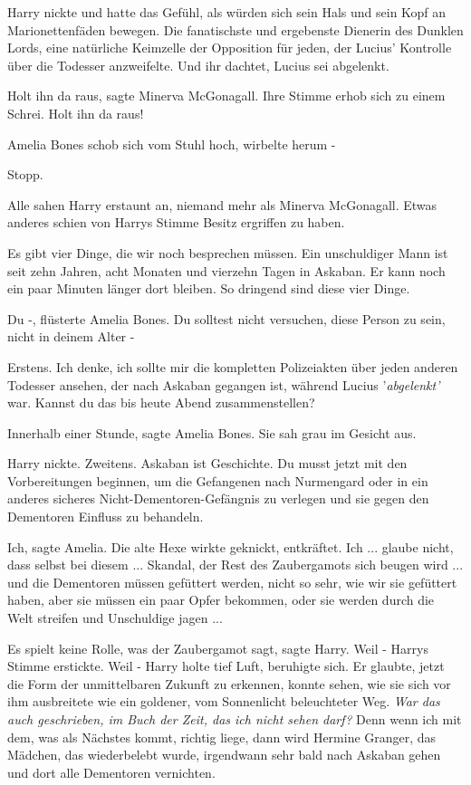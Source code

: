 Harry nickte und hatte das Gefühl, als würden sich sein Hals und sein Kopf an
Marionettenfäden bewegen. \glqq{}Die fanatischste und ergebenste Dienerin des
Dunklen Lords, eine natürliche Keimzelle der Opposition für jeden, der Lucius'
Kontrolle über die Todesser anzweifelte. Und ihr dachtet, Lucius sei abgelenkt.\grqq{}

\glqq{}Holt ihn da raus\grqq{}, sagte Minerva McGonagall. Ihre Stimme erhob sich
zu einem Schrei. \glqq{}Holt ihn da raus!\grqq{}

Amelia Bones schob sich vom Stuhl hoch, wirbelte herum -

\glqq{}Stopp.\grqq{}

Alle sahen Harry erstaunt an, niemand mehr als Minerva McGonagall. Etwas anderes
schien von Harrys Stimme Besitz ergriffen zu haben.

\glqq{}Es gibt vier Dinge, die wir noch besprechen müssen. Ein unschuldiger Mann
ist seit zehn Jahren, acht Monaten und vierzehn Tagen in Askaban. Er kann noch
ein paar Minuten länger dort bleiben. So dringend sind diese vier Dinge.\grqq{}

\glqq{}Du -\grqq{}, flüsterte Amelia Bones. \glqq{}Du solltest nicht versuchen,
diese Person zu sein, nicht in deinem Alter -\grqq{}

\glqq{}Erstens. Ich denke, ich sollte mir die kompletten Polizeiakten über jeden
anderen Todesser ansehen, der nach Askaban gegangen ist, während Lucius
'\emph{abgelenkt'} war. Kannst du das bis heute Abend zusammenstellen?\grqq{}

\glqq{}Innerhalb einer Stunde\grqq{}, sagte Amelia Bones. Sie sah grau im Gesicht
aus.

Harry nickte. \glqq{}Zweitens. Askaban ist Geschichte. Du musst jetzt mit den
Vorbereitungen beginnen, um die Gefangenen nach Nurmengard oder in ein anderes
sicheres Nicht-Dementoren-Gefängnis zu verlegen und sie gegen den Dementoren
Einfluss zu behandeln.\grqq{}

\glqq{}Ich\grqq{}, sagte Amelia. Die alte Hexe wirkte geknickt, entkräftet. \glqq{}
Ich ... glaube nicht, dass selbst bei diesem ... Skandal, der Rest des
Zaubergamots sich beugen wird ... und die Dementoren müssen gefüttert werden,
nicht so sehr, wie wir sie gefüttert haben, aber sie müssen ein paar Opfer
bekommen, oder sie werden durch die Welt streifen und Unschuldige jagen ...\grqq{}

\glqq{}Es spielt keine Rolle, was der Zaubergamot sagt\grqq{}, sagte Harry. \glqq{}
Weil -\grqq{} Harrys Stimme erstickte. \glqq{}Weil -\grqq{} Harry holte tief Luft, beruhigte
sich. Er glaubte, jetzt die Form der unmittelbaren Zukunft zu erkennen, konnte
sehen, wie sie sich vor ihm ausbreitete wie ein goldener, vom Sonnenlicht
beleuchteter Weg.
\emph{War das auch geschrieben, im Buch der Zeit, das ich nicht sehen darf?}
\glqq{}Denn wenn ich mit dem, was als Nächstes kommt, richtig liege, dann wird
Hermine Granger, das Mädchen, das wiederbelebt wurde, irgendwann sehr bald nach
Askaban gehen und dort alle Dementoren vernichten.\grqq{}

